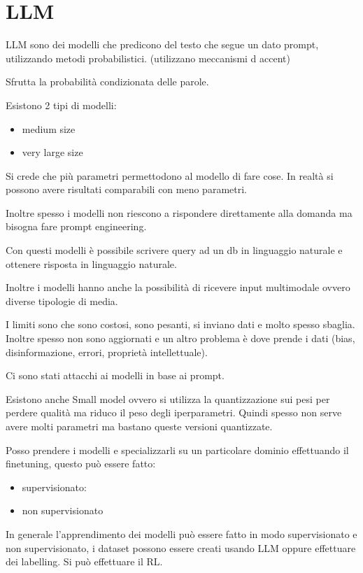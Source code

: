\chapter{LLM}

LLM sono dei modelli che predicono del testo che segue un dato prompt, utilizzando 
metodi probabilistici. (utilizzano meccanismi d accent)

Sfrutta la probabilità condizionata delle parole.

Esistono 2 tipi di modelli:
\begin{itemize}
    \item medium size
    \item very large size
\end{itemize}

Si crede che più parametri permettodono al modello di fare cose. In realtà si possono 
avere risultati comparabili con meno parametri.

Inoltre spesso i modelli non riescono a rispondere direttamente alla domanda ma 
bisogna fare prompt engineering.

Con questi modelli è possibile scrivere query ad un db in linguaggio naturale e 
ottenere risposta in linguaggio naturale. 

Inoltre i modelli hanno anche la possibilità di ricevere input multimodale ovvero
diverse tipologie di media.

I limiti sono che sono costosi, sono pesanti, si inviano dati e molto spesso 
sbaglia. Inoltre spesso non sono aggiornati e un altro problema è dove prende i 
dati (bias, disinformazione, errori, proprietà intellettuale).

Ci sono stati attacchi ai modelli in base ai prompt.

Esistono anche Small model ovvero si utilizza la quantizzazione sui pesi per 
perdere qualità ma riduco il peso degli iperparametri. Quindi spesso non serve 
avere molti parametri ma bastano queste versioni quantizzate.

Posso prendere i modelli e specializzarli su un particolare dominio effettuando il 
finetuning, questo può essere fatto:
\begin{itemize}
    \item supervisionato: 
    \item non supervisionato 
\end{itemize}

In generale l'apprendimento dei modelli può essere fatto in modo supervisionato 
e non supervisionato, i dataset possono essere creati usando LLM oppure effettuare 
dei labelling.
Si può effettuare il RL.

